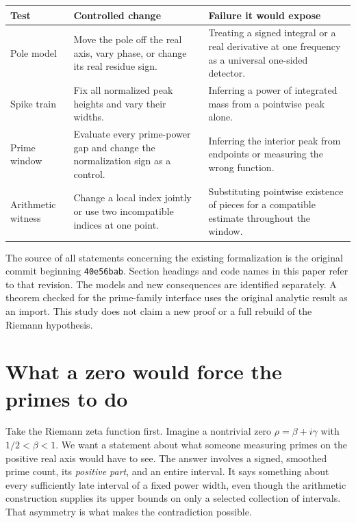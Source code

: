 \documentclass[12pt,letterpaper]{article}
\begin{document}
\begin{center}\small
\begin{tabularx}{\linewidth}{@{}p{.2\linewidth}YY@{}}
\toprule
Test & Controlled change & Failure it would expose\\\midrule
Pole model & Move the pole off the real axis, vary phase, or change its real residue sign. & Treating a signed integral or a real derivative at one frequency as a universal one-sided detector.\\
Spike train & Fix all normalized peak heights and vary their widths. & Inferring a power of integrated mass from a pointwise peak alone.\\
Prime window & Evaluate every prime-power gap and change the normalization sign as a control. & Inferring the interior peak from endpoints or measuring the wrong function.\\
Arithmetic witness & Change a local index jointly or use two incompatible indices at one point. & Substituting pointwise existence of pieces for a compatible estimate throughout the window.\\
\bottomrule\end{tabularx}
\end{center}
The source of all statements concerning the existing formalization is the original commit beginning \texttt{40e56bab}. Section headings and code names in this paper refer to that revision. The models and new consequences are identified separately. A theorem checked for the prime-family interface uses the original analytic result as an import. This study does not claim a new proof or a full rebuild of the Riemann hypothesis.



\section{What a zero would force the primes to do}\label{sec:zero-analytic}
Take the Riemann zeta function first. Imagine a nontrivial zero \(\rho=\beta+i\gamma\) with \(1/2<\beta<1\). We want a statement about what someone measuring primes on the positive real axis would have to see. The answer involves a signed, smoothed prime count, its \emph{positive part}, and an entire interval. It says something about every sufficiently late interval of a fixed power width, even though the arithmetic construction supplies its upper bounds on only a selected collection of intervals. That asymmetry is what makes the contradiction possible.

\providecommand{\wzlink}[3]{\href{https://github.com/nousentllc/riemann-hypothesis/blob/40e56bab026552e089d7afcfeff08d2defb9c005/src/Development/AutomorphicArithmetic/DedekindLFunctions/#1.lean\#L#2}{#3}}
\end{document}
